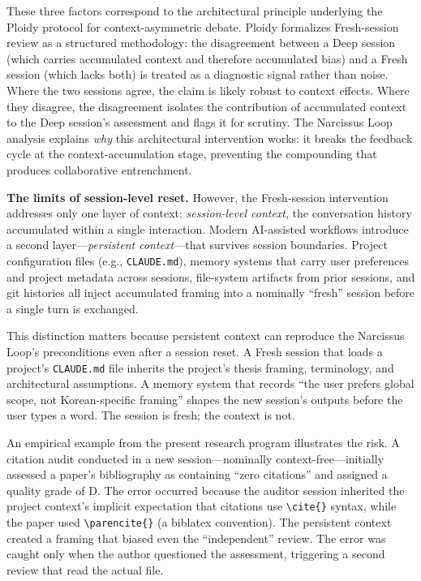 \documentclass[12pt]{article}
\begin{document}
These three factors correspond to the architectural principle underlying the Ploidy protocol for context-asymmetric debate. Ploidy formalizes Fresh-session review as a structured methodology: the disagreement between a Deep session (which carries accumulated context and therefore accumulated bias) and a Fresh session (which lacks both) is treated as a diagnostic signal rather than noise. Where the two sessions agree, the claim is likely robust to context effects. Where they disagree, the disagreement isolates the contribution of accumulated context to the Deep session's assessment and flags it for scrutiny. The Narcissus Loop analysis explains \emph{why} this architectural intervention works: it breaks the feedback cycle at the context-accumulation stage, preventing the compounding that produces collaborative entrenchment.

\textbf{The limits of session-level reset.} However, the Fresh-session intervention addresses only one layer of context: \emph{session-level context}, the conversation history accumulated within a single interaction. Modern AI-assisted workflows introduce a second layer---\emph{persistent context}---that survives session boundaries. Project configuration files (e.g., \texttt{CLAUDE.md}), memory systems that carry user preferences and project metadata across sessions, file-system artifacts from prior sessions, and git histories all inject accumulated framing into a nominally ``fresh'' session before a single turn is exchanged.

This distinction matters because persistent context can reproduce the Narcissus Loop's preconditions even after a session reset. A Fresh session that loads a project's \texttt{CLAUDE.md} file inherits the project's thesis framing, terminology, and architectural assumptions. A memory system that records ``the user prefers global scope, not Korean-specific framing'' shapes the new session's outputs before the user types a word. The session is fresh; the context is not.

An empirical example from the present research program illustrates the risk. A citation audit conducted in a new session---nominally context-free---initially assessed a paper's bibliography as containing ``zero citations'' and assigned a quality grade of D. The error occurred because the auditor session inherited the project context's implicit expectation that citations use \texttt{\textbackslash cite\{\}} syntax, while the paper used \texttt{\textbackslash parencite\{\}} (a biblatex convention). The persistent context created a framing that biased even the ``independent'' review. The error was caught only when the author questioned the assessment, triggering a second review that read the actual file.
\end{document}
